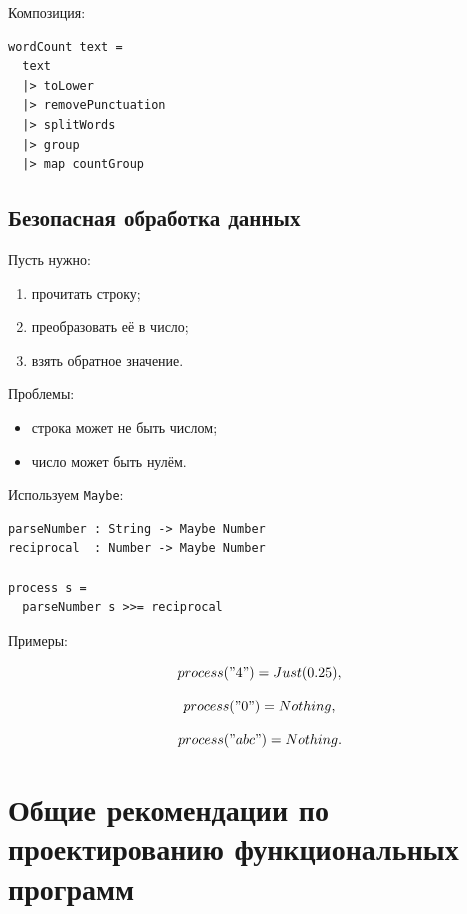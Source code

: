 \documentclass[12pt,a4paper]{article}
\begin{document}
Композиция:

\begin{lstlisting}
wordCount text =
  text
  |> toLower
  |> removePunctuation
  |> splitWords
  |> group
  |> map countGroup
\end{lstlisting}

\subsection{Безопасная обработка данных}

Пусть нужно:
\begin{enumerate}
  \item прочитать строку;
  \item преобразовать её в число;
  \item взять обратное значение.
\end{enumerate}

Проблемы:
\begin{itemize}
  \item строка может не быть числом;
  \item число может быть нулём.
\end{itemize}

Используем \texttt{Maybe}:

\begin{lstlisting}
parseNumber : String -> Maybe Number
reciprocal  : Number -> Maybe Number

process s =
  parseNumber s >>= reciprocal
\end{lstlisting}

Примеры:

\[
process("4") = Just(0.25),
\]

\[
process("0") = Nothing,
\]

\[
process("abc") = Nothing.
\]

\section{Общие рекомендации по проектированию функциональных программ}
\end{document}
